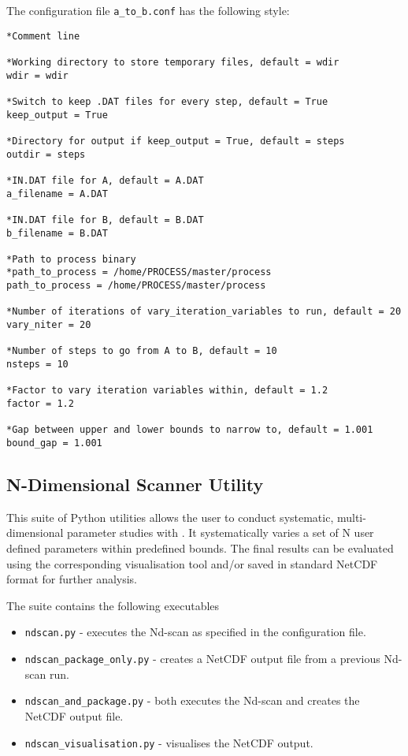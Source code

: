 The configuration file \texttt{a\_to\_b.conf} has the following style:
\begin{framed}
\begin{verbatim}
*Comment line

*Working directory to store temporary files, default = wdir
wdir = wdir

*Switch to keep .DAT files for every step, default = True
keep_output = True

*Directory for output if keep_output = True, default = steps
outdir = steps

*IN.DAT file for A, default = A.DAT
a_filename = A.DAT

*IN.DAT file for B, default = B.DAT
b_filename = B.DAT

*Path to process binary
*path_to_process = /home/PROCESS/master/process
path_to_process = /home/PROCESS/master/process

*Number of iterations of vary_iteration_variables to run, default = 20
vary_niter = 20

*Number of steps to go from A to B, default = 10
nsteps = 10

*Factor to vary iteration variables within, default = 1.2
factor = 1.2

*Gap between upper and lower bounds to narrow to, default = 1.001
bound_gap = 1.001
\end{verbatim}
\end{framed}

\subsection{N-Dimensional Scanner Utility}

This suite of Python utilities allows the user to conduct systematic, multi-dimensional parameter studies with \process. It systematically varies a set of N user defined parameters within predefined bounds. The final results can be evaluated using the corresponding visualisation tool and/or saved in standard NetCDF format for further analysis.

The suite contains the following executables
\begin{itemize}
\item \texttt{ndscan.py} - executes the Nd-scan as specified in the configuration file.
\item \texttt{ndscan\_package\_only.py} - creates a NetCDF output file from a previous Nd-scan run.
\item \texttt{ndscan\_and\_package.py} - both executes the Nd-scan and creates the NetCDF output file.
\item \texttt{ndscan\_visualisation.py} - visualises the NetCDF output.
\end{itemize}


